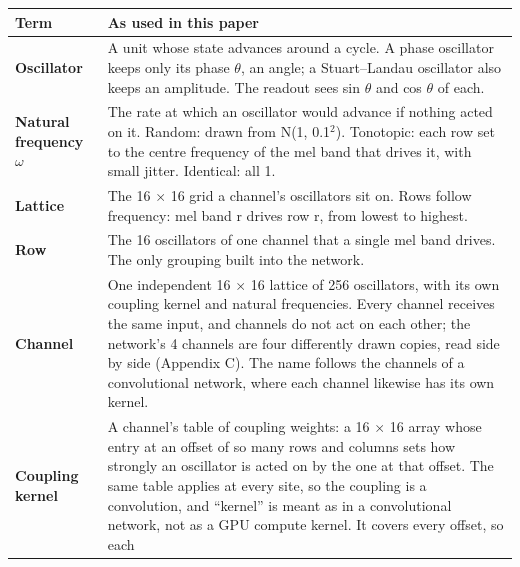\documentclass[10pt]{article}
\newcounter{none} %
\begin{document}
{\def\LTcaptype{none} %
\begin{longtable}[]{@{}
  >{\raggedright\arraybackslash}p{}
  >{\raggedright\arraybackslash}p{}@{}}
\toprule\noalign{}
\begin{minipage}[b]{\linewidth}\raggedright
Term
\end{minipage} & \begin{minipage}[b]{\linewidth}\raggedright
As used in this paper
\end{minipage} \\
\midrule\noalign{}
\endhead
\bottomrule\noalign{}
\endlastfoot
\textbf{Oscillator} & A unit whose state advances around a cycle. A
phase oscillator keeps only its phase \ensuremath{\theta}, an angle; a
Stuart--Landau oscillator also keeps an amplitude. The readout sees sin
\ensuremath{\theta} and cos \ensuremath{\theta} of each. \\
\cmidrule{1-2}\textbf{Natural frequency \ensuremath{\omega}} & The rate
at which an oscillator would advance if nothing acted on it. Random:
drawn from N(1, 0.1\ensuremath{^{2}}). Tonotopic: each row set to the
centre frequency of the mel band that drives it, with small jitter.
Identical: all 1. \\
\cmidrule{1-2}\textbf{Lattice} & The 16 \ensuremath{\times} 16 grid a
channel's oscillators sit on. Rows follow frequency: mel band r drives
row r, from lowest to highest. \\
\cmidrule{1-2}\textbf{Row} & The 16 oscillators of one channel that a
single mel band drives. The only grouping built into the network. \\
\cmidrule{1-2}\textbf{Channel} & One independent 16 \ensuremath{\times}
16 lattice of 256 oscillators, with its own coupling kernel and natural
frequencies. Every channel receives the same input, and channels do not
act on each other; the network's 4 channels are four differently drawn
copies, read side by side (Appendix C). The name follows the channels of
a convolutional network, where each channel likewise has its own
kernel. \\
\cmidrule{1-2}\textbf{Coupling kernel} & A channel's table of coupling
weights: a 16 \ensuremath{\times} 16 array whose entry at an offset of
so many rows and columns sets how strongly an oscillator is acted on by
the one at that offset. The same table applies at every site, so the
coupling is a convolution, and ``kernel'' is meant as in a convolutional
network, not as a GPU compute kernel. It covers every offset, so each

\end{longtable}}
\end{document}

